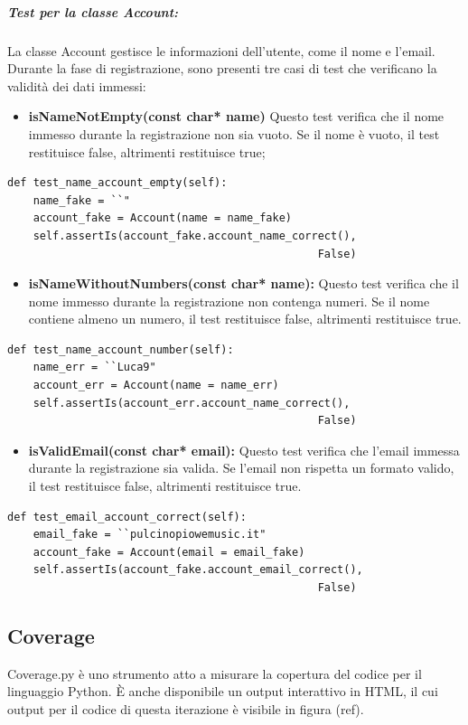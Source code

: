 \subparagraph{Test per la classe \textbf{Account:}} La classe Account gestisce le informazioni dell'utente, come il nome e l'email. 
Durante la fase di registrazione, sono presenti tre casi di test che verificano la validità dei dati immessi:
\vspace{0.2cm}
\begin{itemize}
    \item \textbf{isNameNotEmpty(const char* name)}
    Questo test verifica che il nome immesso durante la registrazione non sia vuoto. Se il nome è vuoto, il test restituisce false, altrimenti restituisce true;
\end{itemize}
\begin{lstlisting}[caption={class AccountModelTests(TestCase)}, captionpos=b]   
def test_name_account_empty(self):
    name_fake = ``"
    account_fake = Account(name = name_fake)
    self.assertIs(account_fake.account_name_correct(), 
                                                False)
\end{lstlisting} 
\vspace{0.2cm}

\begin{itemize}    
    \item \textbf{isNameWithoutNumbers(const char* name):}
    Questo test verifica che il nome immesso durante la registrazione non contenga numeri. Se il nome contiene almeno un numero, il test restituisce false, altrimenti restituisce true.
\end{itemize}
\begin{lstlisting}[caption={class AccountModelTests(TestCase)}, captionpos=b]
def test_name_account_number(self):
    name_err = ``Luca9"
    account_err = Account(name = name_err)
    self.assertIs(account_err.account_name_correct(), 
                                                False)
\end{lstlisting} 
\vspace{0.2cm}

\begin{itemize}
    \item \textbf{isValidEmail(const char* email):}
    Questo test verifica che l'email immessa durante la registrazione sia valida. Se l'email non rispetta un formato valido, il test restituisce false, altrimenti restituisce true.
\end{itemize}
\begin{lstlisting}[caption={class AccountModelTests(TestCase)}, captionpos=b]
def test_email_account_correct(self):
    email_fake = ``pulcinopiowemusic.it"
    account_fake = Account(email = email_fake)
    self.assertIs(account_fake.account_email_correct(), 
                                                False)
\end{lstlisting}

\subsection{Coverage}
Coverage.py è uno strumento atto a misurare la copertura del codice per il linguaggio
Python. È anche disponibile un output interattivo in HTML, il cui output per il codice di questa iterazione è visibile
in figura (ref).